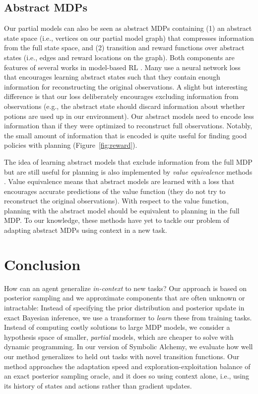 \documentclass[sigconf]{aamas}
\begin{document}
\subsection{Abstract MDPs} Our partial models can also be seen as abstract MDPs containing (1) an abstract state space (i.e., vertices on our partial model graph) that compresses information from the full state space, and (2) transition and reward functions over abstract states (i.e., edges and reward locations on the graph). Both components are features of several works in model-based RL \cite{moerlandModelbasedReinforcementLearning2022,haWorldModels2018}. Many use a neural network loss that encourages learning abstract states such that they contain enough information for reconstructing the original observations. A slight but interesting difference is that our loss deliberately encourages excluding information from observations (e.g., the abstract state should discard information about whether potions are used up in our environment). Our abstract models need to encode less information than if they were optimized to reconstruct full observations. Notably, the small amount of information that is encoded is quite useful for finding good policies with planning (Figure~\ref{fig:reward}).

The idea of learning abstract models that exclude information from the full MDP but are still useful for planning is also implemented by \textit{value equivalence} methods \citep[e.g.,][]{schrittwieserMasteringAtariGo2020,silverPredictronEndToEndLearning2017,ohValuePredictionNetwork2017,farquharTreeQNATreeCDifferentiable2018,tamarValueIterationNetworks2016}. Value equivalence means that abstract models are learned with a loss that encourages accurate predictions of the value function (they do not try to reconstruct the original observations). With respect to the value function, planning with the abstract model should be equivalent to planning in the full MDP. To our knowledge, these methods have yet to tackle our problem of adapting abstract MDPs using context in a new task.

\section{Conclusion}\label{sec:conc}
How can an agent generalize \textit{in-context} to new tasks? Our approach is based on posterior sampling \cite{thompsonLikelihoodThatOne1933,strensBayesianFrameworkReinforcement2000,osbandMoreEfficientReinforcement2013} and we approximate components that are often unknown or intractable: Instead of specifying the prior distribution and posterior update in exact Bayesian inference, we use a transformer to \textit{learn} these from training tasks. Instead of computing costly solutions to large MDP models, we consider a hypothesis space of smaller, \textit{partial} models, which are cheaper to solve with dynamic programming. In our version of Symbolic Alchemy, we evaluate how well our method generalizes to held out tasks with novel transition functions. Our method approaches the adaptation speed and exploration-exploitation balance of an exact posterior sampling oracle, and it does so using context alone, i.e., using its history of states and actions rather than gradient updates.
\end{document}

